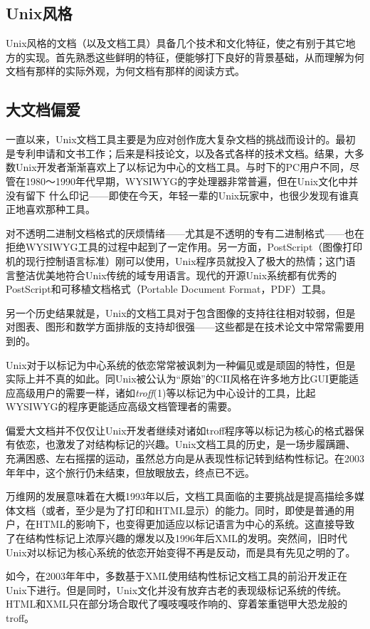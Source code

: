 \documentclass[12pt,oneside]{book}
\begin{document}
\begin{common-format}
\section{Unix风格}
Unix风格的文档（以及文档工具）具备几个技术和文化特征，使之有别于其它地方的实现。首先熟悉这些鲜明的特征，便能够打下良好的背景基础，从而理解为何文档有那样的实际外观，为何文档有那样的阅读方式。

\subsection{大文档偏爱}
一直以来，Unix文档工具主要是为应对创作庞大复杂文档的挑战而设计的。最初是专利申请和文书工作；后来是科技论文，以及各式各样的技术文档。结果，大多数Unix开发者渐渐喜欢上了以标记为中心的文档工具。与时下的PC用户不同，尽管在1980～1990年代早期，WYSIWYG的字处理器非常普遍，但在Unix文化中并没有留下
什么印记——即使在今天，年轻一辈的Unix玩家中，也很少发现有谁真正地喜欢那种工具。

对不透明二进制文档格式的厌烦情绪——尤其是不透明的专有二进制格式——也在拒绝WYSIWYG工具的过程中起到了一定作用。另一方面，PostScript（图像打印机的现行控制语言标准）刚可以使用，Unix程序员就投入了极大的热情；这门语言整洁优美地符合Unix传统的域专用语言。现代的开源Unix系统都有优秀的PostScript和可移植文档格式（Portable Document Format，PDF）工具。

另一个历史结果就是，Unix的文档工具对于包含图像的支持往往相对较弱，但是对图表、图形和数学方面排版的支持却很强——这些都是在技术论文中常常需要用到的。

Unix对于以标记为中心系统的依恋常常被讽刺为一种偏见或是顽固的特性，但是实际上并不真的如此。同Unix被公认为“原始”的CII风格在许多地方比GUI更能适应高级用户的需要一样，诸如\textit{troff}(1)等以标记为中心设计的工具，比起WYSIWYG的程序更能适应高级文档管理者的需要。

偏爱大文档并不仅仅让Unix开发者继续对诸如troff程序等以标记为核心的格式器保有依恋，也激发了对结构标记的兴趣。Unix文档工具的历史，是一场步履蹒跚、充满困惑、左右摇摆的运动，虽然总方向是从表现性标记转到结构性标记。在2003年年中，这个旅行仍未结束，但放眼放去，终点已不远。

万维网的发展意味着在大概1993年以后，文档工具面临的主要挑战是提高描绘多媒体文档（或者，至少是为了打印和HTML显示）的能力。同时，即使是普通的用户，在HTML的影响下，也变得更加适应以标记语言为中心的系统。这直接导致了在结构性标记上浓厚兴趣的爆发以及1996年后XML的发明。突然间，旧时代Unix对以标记为核心系统的依恋开始变得不再是反动，而是具有先见之明的了。

如今，在2003年年中，多数基于XML使用结构性标记文档工具的前沿开发正在Unix下进行。但是同时，Unix文化并没有放弃古老的表现级标记系统的传统。HTML和XML只在部分场合取代了嘎吱嘎吱作响的、穿着笨重铠甲大恐龙般的troff。


\end{common-format}
\end{document}
